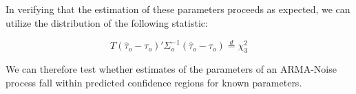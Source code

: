 In verifying that the estimation of these parameters proceeds as expected, we can utilize the distribution of the following statistic:

\begin{equation}
    \label{eq:chisq_o_t}
    T(\hat{\tau}_o - \tau_o)'\Sigma_o^{-1}(\hat{\tau}_o - \tau_o) \overset{d}{=} \chi^2_3
\end{equation}

We can therefore test whether estimates of the parameters of an ARMA-Noise process fall within predicted confidence regions for known parameters.